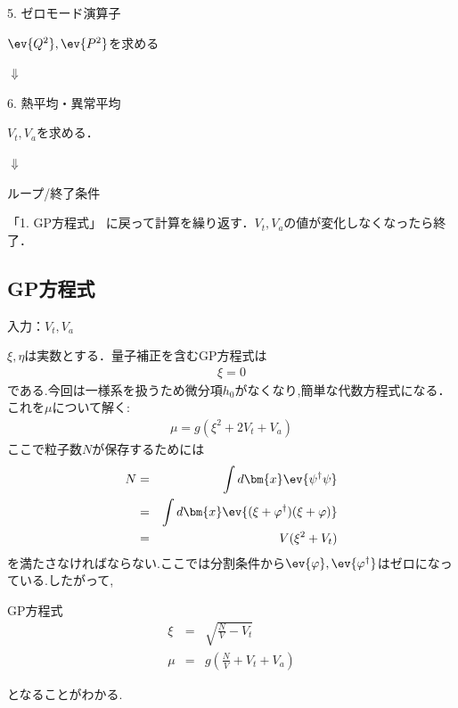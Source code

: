 \documentclass[10.5pt,a4paper]{jreport}
\begin{document}
\begin{itembox}[c]{5. ゼロモード演算子}
  \begin{center}
    $\ev{Q^2}, \ev{P^2}$を求める
  \end{center}
\end{itembox}

\begin{center}
  $\Downarrow$
\end{center}

\begin{itembox}[c]{6. 熱平均・異常平均}
  \begin{center}
    $V_t, V_a$を求める．
  \end{center}
\end{itembox}

\begin{center}
  $\Downarrow$
\end{center}

\begin{itembox}[c]{ループ/終了条件}
  \begin{center}
    「1. GP方程式」 に戻って計算を繰り返す．$V_t, V_a$の値が変化しなくなったら終了．
  \end{center}
\end{itembox}

\subsection{GP方程式}
入力：$V_t,V_a$

$\xi,\eta$は実数とする．量子補正を含むGP方程式は
\begin{eqnarray}
  [-\mu + g\xi^2 + g(2V_t + V_a)]\xi = 0
\end{eqnarray}  
である.今回は一様系を扱うため微分項$h_0$がなくなり,簡単な代数方程式になる．これを$\mu$について解く:
\begin{eqnarray}
  \mu = g(\xi^2 + 2V_t + V_a)
\end{eqnarray}
ここで粒子数$N$が保存するためには
\begin{eqnarray}
  \nonumber  N &=& \int d\bm{x}\ev{\psi^\dagger\psi}\\
  \nonumber  &=& \int d\bm{x}\ev{(\xi + \varphi^\dagger)(\xi + \varphi)}\\
  &=& V(\xi^2 + V_t)
\end{eqnarray}
を満たさなければならない.ここでは分割条件から$\ev{\varphi},\ev{\varphi^\dagger}$はゼロになっている.したがって,
\begin{itembox}[c]{GP方程式}
  \begin{eqnarray}
    \xi &=& \sqrt{\frac{N}{V} - V_t}\\
    \mu &=& g(\frac{N}{V} + V_t + V_a)
  \end{eqnarray}
\end{itembox}
となることがわかる.
\end{document}
